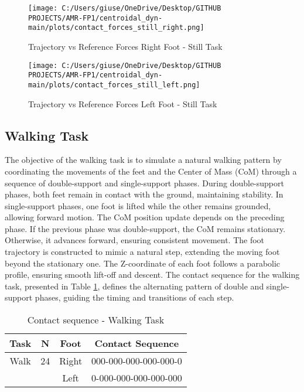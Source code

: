 \documentclass[main.tex]{subfiles}
\begin{document}
\begin{sloppypar}
\begin{figure}[htbp]
    \centering
    \texttt{[image: C:/Users/giuse/OneDrive/Desktop/GITHUB PROJECTS/AMR-FP1/centroidal\_dyn-main/plots/contact\_forces\_still\_right.png]}
    \caption{Trajectory vs Reference Forces Right Foot - Still Task}
    \label{fig:contact_forces_still_right}
\end{figure}
\begin{figure}[htbp]
    \centering
    \texttt{[image: C:/Users/giuse/OneDrive/Desktop/GITHUB PROJECTS/AMR-FP1/centroidal\_dyn-main/plots/contact\_forces\_still\_left.png]}
    \caption{Trajectory vs Reference Forces Left Foot - Still Task}
    \label{fig:contact_forces_still_left}
\end{figure}
\newpage
\subsection{Walking Task}
The objective of the walking task is to simulate a natural walking pattern by coordinating the movements of the feet and the Center of Mass (CoM) through a sequence of double-support and single-support phases. During double-support phases, both feet remain in contact with the ground, maintaining stability. In single-support phases, one foot is lifted while the other remains grounded, allowing forward motion.
The CoM position update depends on the preceding phase. If the previous phase was double-support, the CoM remains stationary. Otherwise, it advances forward, ensuring consistent movement. The foot trajectory is constructed to mimic a natural step, extending the moving foot beyond the stationary one. The Z-coordinate of each foot follows a parabolic profile, ensuring smooth lift-off and descent.
The contact sequence for the walking task, presented in Table \ref{tab:walkingtask}, defines the alternating pattern of double and single-support phases, guiding the timing and transitions of each step.
\begin{table}[H]
    \centering
    \begin{tabular}{|c|c|c|c|}
        \hline
        Task & N & Foot & Contact Sequence \\
        \hline
        Walk & 24 & Right & 000-000-000-000-000-0 \\
             &    & Left  & 0-000-000-000-000-000 \\
        \hline
    \end{tabular}
    \caption{Contact sequence - Walking Task}
    \label{tab:walkingtask}
\end{table}

\end{sloppypar}
\end{document}
